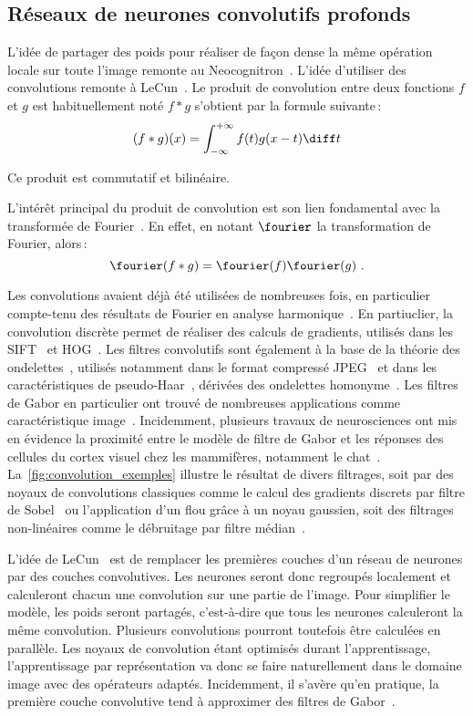 \subsection{Réseaux de neurones convolutifs profonds}

L'idée de partager des poids pour réaliser de façon dense la même opération locale sur toute l'image remonte au Neocognitron~\cite{fukushima_neocognitron_1980}. L'idée d'utiliser des convolutions remonte à LeCun~\cite{lecun_gradient-based_1998}. Le produit de convolution entre deux fonctions $f$ et $g$ est habituellement noté $f * g$ s'obtient par la formule suivante\,:
$$(f * g)(x) = \int_{-\infty}^{+\infty} f(t)g(x-t)\diff t$$

Ce produit est commutatif et bilinéaire.

L'intérêt principal du produit de convolution est son lien fondamental avec la transformée de Fourier~\cite{fourier_propagation_1822}. En effet, en notant $\fourier$ la transformation de Fourier, alors\,:
$$\fourier(f \ast g) = \fourier (f)\fourier (g)~.$$

Les convolutions avaient déjà été utilisées de nombreuses fois, en particulier compte-tenu des résultats de Fourier en analyse harmonique~\cite{fourier_propagation_1822}. En partiuclier, la convolution discrète permet de réaliser des calculs de gradients, utilisés dans les \gls{SIFT}~\cite{lowe_object_1999} et \gls{HOG}~\cite{dalal_histograms_2005}. Les filtres convolutifs sont également à la base de la théorie des ondelettes~\cite{mallat_exploration_2001}, utilisés notamment dans le format compressé \gls{JPEG}~\cite{daubechies_ten_1992} et dans les caractéristiques de pseudo-Haar~\cite{viola_robust_2001}, dérivées des ondelettes homonyme~\cite{papageorgiou_general_1998}.
Les filtres de Gabor en particulier ont trouvé de nombreuses applications comme caractéristique image~\cite{pati_word_2008}. Incidemment, plusieurs travaux de neurosciences ont mis en évidence la proximité entre le modèle de filtre de Gabor et les réponses des cellules du cortex visuel chez les mammifères, notamment le chat~\cite{marcelja_mathematical_1980,jones_evaluation_1987}. La~\cref{fig:convolution_exemples} illustre le résultat de divers filtrages, soit par des noyaux de convolutions classiques comme le calcul des gradients discrets par filtre de Sobel~\cite{sobel_isotropic_2014} ou l'application d'un flou grâce à un noyau gaussien, soit des filtrages non-linéaires comme le débruitage par filtre médian~\cite{frieden_new_1976}.

L'idée de LeCun~\cite{lecun_gradient-based_1998} est de remplacer les premières couches d'un réseau de neurones par des couches convolutives. Les neurones seront donc regroupés localement et calculeront chacun une convolution sur une partie de l'image. Pour simplifier le modèle, les poids seront partagés, c'est-à-dire que tous les neurones calculeront la même convolution. Plusieurs convolutions pourront toutefois être calculées en parallèle. Les noyaux de convolution étant optimisés durant l'apprentissage, l'apprentissage par représentation va donc se faire naturellement dans le domaine image avec des opérateurs adaptés. Incidemment, il s'avère qu'en pratique, la première couche convolutive tend à approximer des filtres de Gabor~\cite{yosinski_how_2014}.

